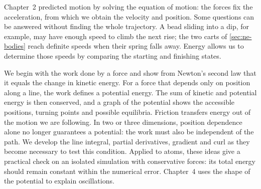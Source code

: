 Chapter~2 predicted motion by solving the equation of motion: the forces
fix the acceleration, from which we obtain the velocity and position.
Some questions can be answered without finding the whole trajectory.
A bead sliding into a dip, for example, may have enough speed to climb the
next rise; the two carts of \cref{sec:ne-bodies} reach definite speeds
when their spring falls away. Energy allows us to determine those speeds
by comparing the starting and finishing states.

We begin with the work done by a force and show from Newton's second law
that it equals the change in kinetic energy. For a force that depends
only on position along a line, the work defines a potential energy.
The sum of kinetic and potential energy is then conserved, and a graph
of the potential shows the accessible positions, turning points and
possible equilibria. Friction transfers energy out of the motion we are
following. In two or three dimensions, position dependence alone no longer
guarantees a potential: the work must also be independent of the path.
We develop the line integral, partial derivatives, gradient and curl as
they become necessary to test this condition. Applied to atoms, these
ideas give a practical check on an isolated simulation with conservative
forces: its total energy should remain constant within the numerical
error. Chapter~4 uses the shape of the potential to explain oscillations.

